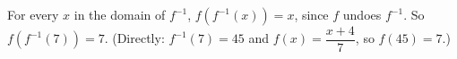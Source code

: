 For every $x$ in the domain of $f^{-1}$, $f\left(f^{-1}(x)\right)=x$, since $f$ undoes $f^{-1}$. So $f\left(f^{-1}(7)\right)=\boxed{7}$. (Directly: $f^{-1}(7)=45$ and $f(x)=\dfrac{x+4}7$, so $f(45)=7$.)
